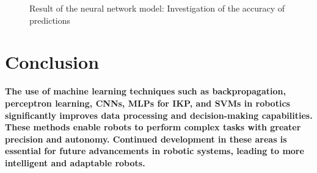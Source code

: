 \documentclass[conference]{IEEEtran}
\begin{document}
\begin{figure}[htbp]
    \centering
     \vfill
     \hfill
    \caption{Result of the neural network model: Investigation of the accuracy of predictions}
    \label{fig:prob5b}
\end{figure}

\vspace{20px}

\section{Conclusion}
\textbf{The use of machine learning techniques such as backpropagation, perceptron learning, CNNs, MLPs for IKP, and SVMs in robotics significantly improves data processing and decision-making capabilities. These methods enable robots to perform complex tasks with greater precision and autonomy. Continued development in these areas is essential for future advancements in robotic systems, leading to more intelligent and adaptable robots.}
\vspace{20px}
\end{document}
